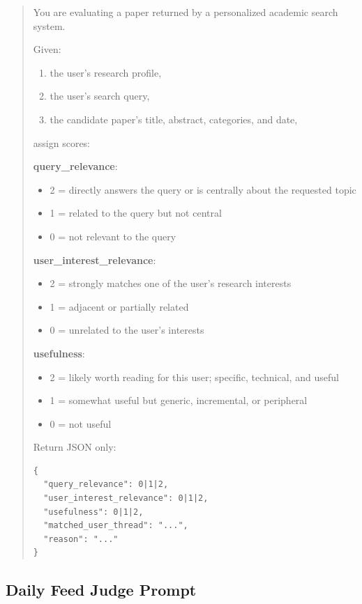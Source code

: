 \documentclass[11pt]{article}
\begin{document}
\begin{quote}
You are evaluating a paper returned by a personalized academic search system.

Given:
\begin{enumerate}
    \item the user's research profile,
    \item the user's search query,
    \item the candidate paper's title, abstract, categories, and date,
\end{enumerate}

assign scores:

\textbf{query\_relevance}:
\begin{itemize}
    \item 2 = directly answers the query or is centrally about the requested topic
    \item 1 = related to the query but not central
    \item 0 = not relevant to the query
\end{itemize}

\textbf{user\_interest\_relevance}:
\begin{itemize}
    \item 2 = strongly matches one of the user's research interests
    \item 1 = adjacent or partially related
    \item 0 = unrelated to the user's interests
\end{itemize}

\textbf{usefulness}:
\begin{itemize}
    \item 2 = likely worth reading for this user; specific, technical, and useful
    \item 1 = somewhat useful but generic, incremental, or peripheral
    \item 0 = not useful
\end{itemize}

Return JSON only:

\begin{verbatim}
{
  "query_relevance": 0|1|2,
  "user_interest_relevance": 0|1|2,
  "usefulness": 0|1|2,
  "matched_user_thread": "...",
  "reason": "..."
}
\end{verbatim}
\end{quote}

\subsection{Daily Feed Judge Prompt}
\end{document}
